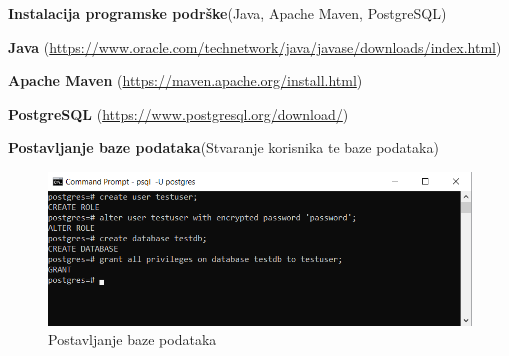 		   	\noindent {}
		   	\begin{packed_enum}
				
					\item \textbf{Instalacija programske podrške}(Java, Apache Maven, PostgreSQL)
    					\begin{packed_item}
                			\item \textbf{Java} (\url{https://www.oracle.com/technetwork/java/javase/downloads/index.html})
                			\item \textbf{Apache Maven} (\url{https://maven.apache.org/install.html})
                			\item \textbf{PostgreSQL} (\url{https://www.postgresql.org/download/})
    		      \end{packed_item}
					\item \textbf{Postavljanje baze podataka}(Stvaranje korisnika te baze podataka)
					
    					\begin{figure}[H]
    					\includegraphics[scale=1]{slike/backend/psqlsetup.png}
    					\centering
    					\caption{Postavljanje baze podataka}
    					\label{fig:PSQL-setup}
    		            \end{figure}
    		            

\end{packed_enum}
